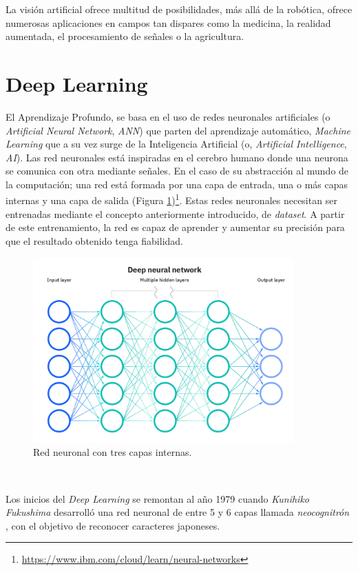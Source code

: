 La visión artificial ofrece multitud de posibilidades, más allá de la robótica, ofrece numerosas aplicaciones en campos tan dispares como la medicina, la realidad aumentada, el procesamiento de señales o la agricultura.\\

\section{Deep Learning}
\label{sec:deeplearning}
El Aprendizaje Profundo, se basa en el uso de redes neuronales artificiales (o {\textit{Artificial Neural Network}}, \textit{ANN}) que parten del aprendizaje automático, \textit{Machine Learning} que a su vez surge de la Inteligencia Artificial (o, \textit{Artificial Intelligence}, \textit{AI}). Las red neuronales está inspiradas en el cerebro humano donde una neurona se comunica con otra mediante señales. En el caso de su abstracción al mundo de la computación; una red está formada por una capa de entrada, una o más capas internas y una capa de salida (Figura \ref{fig:neuralnetwork})\footnote{\url{https://www.ibm.com/cloud/learn/neural-networks}}. Estas redes neuronales necesitan ser entrenadas mediante el concepto anteriormente introducido, de \textit{dataset}. A partir de este entrenamiento, la red es capaz de aprender y aumentar su precisión para que el resultado obtenido tenga fiabilidad.\\

\begin{figure} [h!]
	\begin{center}
		\includegraphics[width=10cm]{figs/neuralnetwork}
	\end{center}
	\caption{Red neuronal con tres capas internas.}
	\label{fig:neuralnetwork}
\end{figure}\

Los inicios del \textit{Deep Learning} se remontan al año 1979 cuando \textit{Kunihiko Fukushima} desarrolló una red neuronal de entre 5 y 6 capas llamada \textit{neocognitrón} \cite{neocognitron}, con el objetivo de reconocer caracteres japoneses.\\

